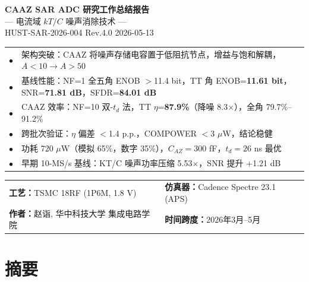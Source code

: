 \documentclass[11pt,a4paper,UTF8]{ctexart}
\begin{document}
\begin{titlepage}\thispagestyle{empty}
\begin{center}\vspace*{2cm}
{\LARGE\bfseries\color{pb}CAAZ SAR ADC 研究工作总结报告}\\[0.3cm]
{\large --- 电流域 $kT/C$ 噪声消除技术 ---}\\[1cm]
{\small HUST-SAR-2026-004 \hspace{2em} Rev.4.0 \hspace{2em} 2026-05-13}\\[1.5cm]
\begin{tcolorbox}[colback=blue!5!white,colframe=pb,sharp corners,title=\textbf{\large\color{pb}核心发现}]
\small\begin{tabular}{ll}
$\bullet$ & 架构突破：CAAZ 将噪声存储电容置于低阻抗节点，增益与饱和解耦，$A<10\rightarrow A>50$ \\
$\bullet$ & 基线性能：NF=1 全五角 ENOB $>$11.4 bit，TT 角 ENOB=\textbf{11.61 bit}，SNR=\textbf{71.81 dB}，SFDR=\textbf{84.01 dB} \\
$\bullet$ & CAAZ 效率：NF=10 双-$t_d$ 法，TT $\eta$=\textbf{87.9\%}（降噪 8.3$\times$），全角 79.7\%--91.2\% \\
$\bullet$ & 跨批次验证：$\eta$ 偏差 $<$1.4 p.p.，COMPOWER $<$3 $\mu$W，结论稳健 \\
$\bullet$ & 功耗 720 $\mu$W（模拟 65\%，数字 35\%），$C_{AZ}=300$ fF，$t_d=26$ ns 最优 \\
$\bullet$ & 早期 10-MS/s 基线：KT/C 噪声功率压缩 5.53$\times$，SNR 提升 $+$1.21 dB \\
\end{tabular}\end{tcolorbox}
\vspace{1.5cm}
\begin{tabular}{ll}
\textbf{工艺：}TSMC 18RF (1P6M, 1.8 V) & \textbf{仿真器：}Cadence Spectre 23.1 (APS)\\
\textbf{作者：}赵诣, 华中科技大学 集成电路学院 & \textbf{时间跨度：}2026年3月--5月\\
\end{tabular}
\end{center}
\end{titlepage}
\tableofcontents\newpage

\section{摘要}
\label{sec:abstract}
\end{document}
